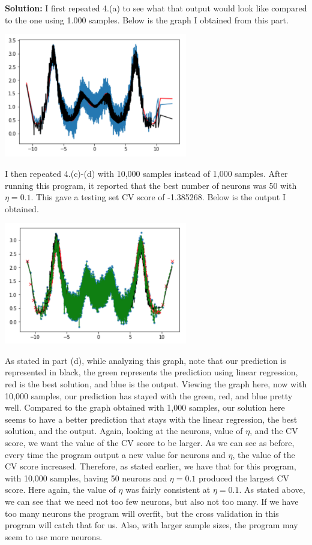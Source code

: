 \documentclass[a4paper]{article}
\begin{document}
\begin{itemize}
    \textbf{Solution:} I first repeated 4.(a) to see what that output would look like compared 
    to the one using 1.000 samples.  Below is the graph I obtained from this part.
    \begin{center}
        \includegraphics[width=0.6\textwidth]{4e-a10000.jpg}
    \end{center}
    I then repeated 4.(c)-(d) with 10,000 samples instead of 1,000 samples.  After running 
    this program, it reported that the best number of neurons was 50 with $\eta = 0.1$.  This 
    gave a testing set CV score of -1.385268.  Below is the output I obtained.
    \begin{center}
        \includegraphics[width=0.6\textwidth]{4e-c.jpg}
    \end{center}
    As stated in part (d), while analyzing this graph, note that our prediction is represented in 
    black, the green represents the prediction using linear regression, red is the best solution, 
    and blue is the output.  Viewing the graph here, now with 10,000 samples, our prediction has 
    stayed with the green, red, and blue pretty well.  Compared to the graph obtained with 1,000 
    samples, our solution here seems to have a better prediction that stays with the linear regression, 
    the best solution, and the output.  Again, looking at the neurons, value of $\eta$, and the CV score, 
    we want the value of the CV score to be larger.  As we can see as before, every time the program 
    output a new value for neurons and $\eta$, the value of the CV score increased.  Therefore, 
    as stated earlier, we have that for this program, with 10,000 samples, having 50 neurons and 
    $\eta = 0.1$ produced the largest CV score.  Here again, the value of $\eta$ was fairly consistent 
    at $\eta = 0.1$.  As stated above, we can see that we need not too few neurons, but also not 
    too many.  If we have too many neurons the program will overfit, but the cross validation in this 
    program will catch that for us.  Also, with larger sample sizes, the program may seem to use more 
    neurons.
\end{itemize}
\end{document}
